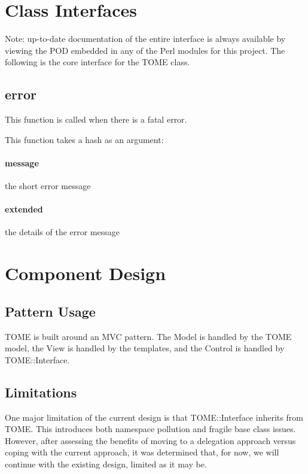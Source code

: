 \documentclass[12pt,titlepage]{article}
\begin{document}
\section{Class Interfaces}
Note: up-to-date documentation of the entire interface is always available by viewing the POD embedded in any of the Perl modules for this project.  The following is the core interface for the TOME class.

\subsection{error}
This function is called when there is a fatal error.

This function takes a hash as an argument:
\paragraph{message}
the short error message
\paragraph{extended}
the details of the error message
\section{Component Design}
\subsection{Pattern Usage}
TOME is built around an MVC pattern.  The Model is handled by the TOME model, the View is handled by the templates, and the Control is handled by TOME::Interface.
\subsection{Limitations}
One major limitation of the current design is that TOME::Interface inherits from TOME.  This introduces both namespace pollution and fragile base class issues.  However, after assessing the benefits of moving to a delegation approach versus coping with the current approach, it was determined that, for now, we will continue with the existing design, limited as it may be.
\end{document}
